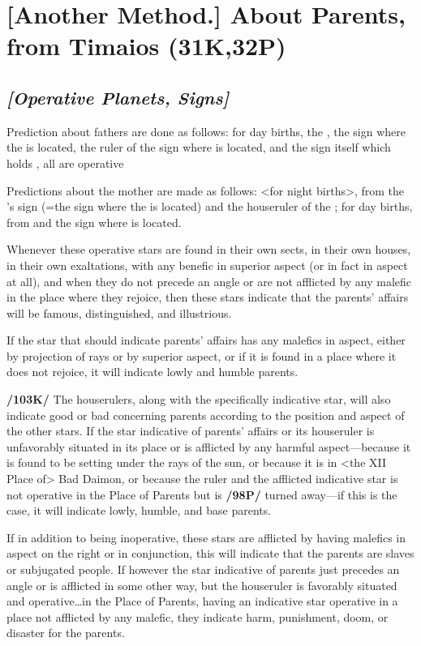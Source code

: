 \section{[Another Method.] About Parents, from Timaios (31K,32P)}

\subsection{\textit{[Operative Planets, Signs]}}
Prediction about fathers are done as follows: for day births, the \Sun, the sign where the \Sun\xspace is located, the ruler of the sign where \Jupiter\xspace is located, and the sign itself which holds \Jupiter, all are operative

Predictions about the mother are made as follows: <for night births>, from the \Moon’s sign (=the sign where the \Moon\xspace is located) and the houseruler of the \Moon; for day births, from \Venus\xspace and the sign where \Venus\xspace is located. 

Whenever these operative stars are found in their own sects, in their own houses, in their own exaltations, with any benefic in superior aspect (or in fact in aspect at all), and when they do not precede an angle or are not afflicted by any malefic in the place where they rejoice, then these stars indicate that the parents’ affairs will be famous, distinguished, and illustrious. 

If the star that should indicate parents’ affairs has any malefics in aspect, either by projection of rays or by superior aspect, or if it is found in a place where it does not rejoice, it will indicate lowly and humble parents.

\textbf{/103K/} The houserulers, along with the specifically indicative star, will also indicate good or bad concerning parents according to the position and aspect of the other stars. If the star indicative of parents’ affairs or its houseruler is unfavorably situated in its place or is afflicted by any harmful aspect—because it is found to be setting under the rays of the sun, or because it is in <the XII Place of> Bad Daimon, or because the ruler and the afflicted indicative star is not operative in the Place of Parents but is \textbf{/98P/} turned away—if this is the case, it will indicate lowly, humble, and base parents. 

If in addition to being inoperative, these stars are afflicted by having malefics in aspect on the right or in conjunction, this will indicate that the parents are slaves or subjugated people. If however the star indicative of parents just precedes an angle or is afflicted in some other way, but the houseruler is favorably situated and operative\ldots in the Place of Parents, having an indicative star operative in a place not afflicted by any malefic, they indicate harm, punishment, doom, or disaster for the parents. 

